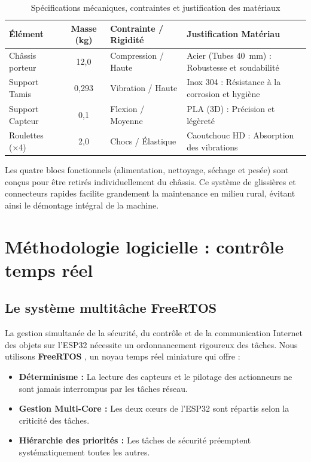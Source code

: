 \begin{table}[H]
    \caption{Spécifications mécaniques, contraintes et justification des matériaux}
    \label{tab:specs_mecanique}
    \centering
    \small
    \renewcommand{\arraystretch}{1.5}
    \begin{tabularx}{\textwidth}{|L|C|L|L|}
        \hline
        \textbf{Élément} & \textbf{Masse (kg)} & \textbf{Contrainte / Rigidité} & \textbf{Justification Matériau} \\ \hline
        Châssis porteur & 12,0 & Compression / Haute & Acier (Tubes 40~mm) : Robustesse et soudabilité \\ \hline
        Support Tamis & 0,293 & Vibration / Haute & Inox 304 : Résistance à la corrosion et hygiène \\ \hline
        Support Capteur & 0,1 & Flexion / Moyenne & PLA (3D) : Précision et légèreté \\ \hline
        Roulettes (×4) & 2,0 & Chocs / Élastique & Caoutchouc HD : Absorption des vibrations \\ \hline
    \end{tabularx}
\end{table}
\FloatBarrier

Les quatre blocs fonctionnels (alimentation, nettoyage, séchage et pesée) sont conçus pour être retirés individuellement du châssis. Ce système de glissières et connecteurs rapides facilite grandement la maintenance en milieu rural, évitant ainsi le démontage intégral de la machine.



\section{Méthodologie logicielle : contrôle temps réel}

\subsection{Le système multitâche FreeRTOS}
La gestion simultanée de la sécurité, du contrôle et de la communication Internet des objets sur l'ESP32 nécessite un ordonnancement rigoureux des tâches. Nous utilisons \textbf{FreeRTOS} \cite{freeRTOS}, un noyau temps réel miniature qui offre :
\begin{itemize}
    \item \textbf{Déterminisme :} La lecture des capteurs et le pilotage des actionneurs ne sont jamais interrompus par les tâches réseau.
    \item \textbf{Gestion Multi-Core :} Les deux cœurs de l'ESP32 sont répartis selon la criticité des tâches.
    \item \textbf{Hiérarchie des priorités :} Les tâches de sécurité préemptent systématiquement toutes les autres.
\end{itemize}

